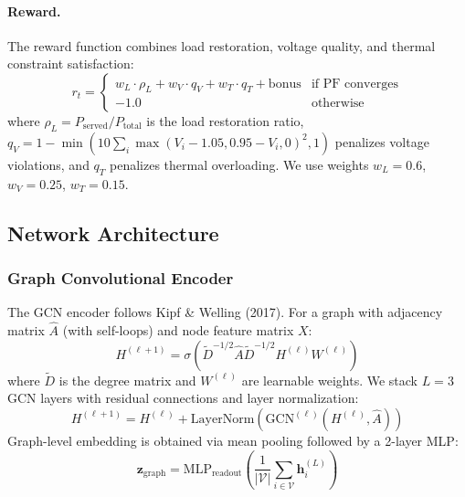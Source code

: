 \documentclass[11pt]{article}
\begin{document}
\paragraph{Reward.} The reward function combines load restoration, voltage quality, and thermal constraint satisfaction:
\begin{equation}
    r_t = \begin{cases}
        w_L \cdot \rho_L + w_V \cdot q_V + w_T \cdot q_T + \text{bonus} & \text{if PF converges} \\
        -1.0 & \text{otherwise}
    \end{cases}
\end{equation}
where $\rho_L = P_{\text{served}} / P_{\text{total}}$ is the load restoration ratio, $q_V = 1 - \min(10 \sum_i \max(V_i - 1.05, 0.95 - V_i, 0)^2, 1)$ penalizes voltage violations, and $q_T$ penalizes thermal overloading. We use weights $w_L = 0.6$, $w_V = 0.25$, $w_T = 0.15$.

\subsection{Network Architecture}

\subsubsection{Graph Convolutional Encoder}
The GCN encoder follows Kipf \& Welling (2017). For a graph with adjacency matrix $\hat{A}$ (with self-loops) and node feature matrix $X$:
\begin{equation}
    H^{(\ell+1)} = \sigma\left(\tilde{D}^{-1/2}\hat{A}\tilde{D}^{-1/2} H^{(\ell)} W^{(\ell)}\right)
\end{equation}
where $\tilde{D}$ is the degree matrix and $W^{(\ell)}$ are learnable weights. We stack $L=3$ GCN layers with residual connections and layer normalization:
\begin{equation}
    H^{(\ell+1)} = H^{(\ell)} + \text{LayerNorm}\left(\text{GCN}^{(\ell)}(H^{(\ell)}, \hat{A})\right)
\end{equation}
Graph-level embedding is obtained via mean pooling followed by a 2-layer MLP:
\begin{equation}
    \mathbf{z}_{\text{graph}} = \text{MLP}_{\text{readout}}\left(\frac{1}{|\mathcal{V}|}\sum_{i \in \mathcal{V}} \mathbf{h}_i^{(L)}\right)
\end{equation}
\end{document}
